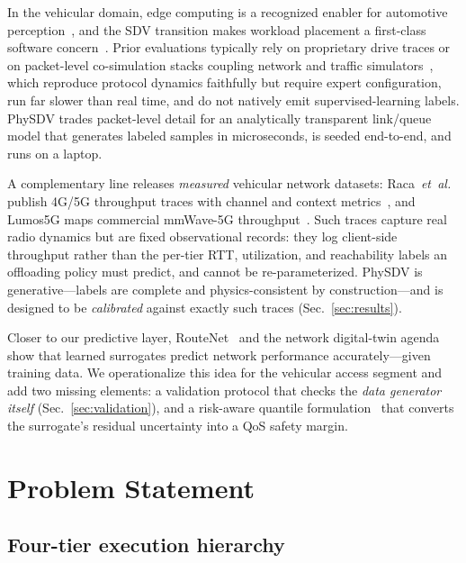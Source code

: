 \documentclass[10pt,conference]{IEEEtran}
\begin{document}
In the vehicular domain, edge computing is a recognized enabler
for automotive perception~\cite{liu2019autodriving}, and the SDV
transition makes workload placement a first-class software
concern~\cite{liu2022sdv}.  Prior evaluations typically rely on
proprietary drive traces or on packet-level co-simulation stacks coupling
network and traffic simulators~\cite{sommer2011veins,lopez2018sumo}, which
reproduce protocol dynamics faithfully but require expert configuration,
run far slower than real time, and do not natively emit
supervised-learning labels.  PhySDV trades packet-level detail for an
analytically transparent link/queue model that generates labeled samples
in microseconds, is seeded end-to-end, and runs on a laptop.

A complementary line releases \emph{measured} vehicular network
datasets: Raca~\emph{et~al.} publish 4G/5G throughput traces with
channel and context metrics~\cite{raca2020}, and Lumos5G maps
commercial mmWave-5G throughput~\cite{narayanan2020lumos}.  Such traces
capture real radio dynamics but are fixed observational records: they
log client-side throughput rather than the per-tier RTT, utilization,
and reachability labels an offloading policy must predict, and cannot
be re-parameterized.  PhySDV is generative---labels are complete and
physics-consistent by construction---and is designed to be
\emph{calibrated} against exactly such traces (Sec.~\ref{sec:results}).

Closer to our predictive layer, RouteNet~\cite{rusek2020routenet}
and the network digital-twin agenda~\cite{almasan2022dtn} show that
learned surrogates predict network performance accurately---given training
data.  We operationalize this idea for the vehicular access segment and
add two missing elements: a validation protocol that checks the \emph{data
generator itself} (Sec.~\ref{sec:validation}), and a risk-aware quantile
formulation~\cite{koenker1978} that converts the surrogate's residual
uncertainty into a QoS safety margin.

\section{Problem Statement}\label{sec:model}

\subsection{Four-tier execution hierarchy}
\end{document}
